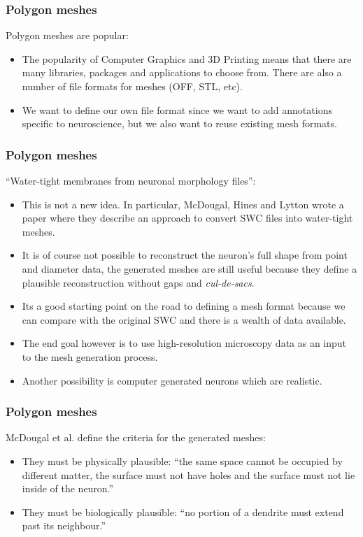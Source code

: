 \documentclass{beamer}
\begin{document}
\begin{frame}
\frametitle{Polygon meshes}

Polygon meshes are popular:

\pause

\begin{itemize}
\item The popularity of Computer Graphics and 3D Printing means that
  there are many libraries, packages and applications to choose
  from. There are also a number of file formats for meshes (OFF, STL,
  etc).
\pause
\item We want to define our own file format since we want to add
  annotations specific to neuroscience, but we also want to reuse
  existing mesh formats.
\end{itemize}

\end{frame}

\begin{frame}
\frametitle{Polygon meshes}

``Water-tight membranes from neuronal morphology files'':

\begin{itemize}
\item This is not a new idea. In particular, McDougal, Hines and
  Lytton wrote a paper\cite{mcdougal2013water} where they describe an
  approach to convert SWC files into water-tight meshes.
\pause
\item It is of course not possible to reconstruct the neuron's full
  shape from point and diameter data, the generated meshes are still
  useful because they define a plausible reconstruction without gaps
  and \emph{cul-de-sacs}.
\pause
\item Its a good starting point on the road to defining a mesh format
  because we can compare with the original SWC and there is a wealth
  of data available.
\pause
\item The end goal however is to use high-resolution microscopy data
  as an input to the mesh generation process.
\pause
\item Another possibility is computer generated neurons which are
  realistic.
\end{itemize}

\end{frame}

\begin{frame}
\frametitle{Polygon meshes}

McDougal et al. define the criteria for the generated meshes:

\begin{itemize}
\item They must be physically plausible: ``the same space cannot be
  occupied by different matter, the surface must not have holes and
  the surface must not lie inside of the
  neuron.''\cite{mcdougal2013water}
\pause
\item They must be biologically plausible: ``no portion of a dendrite
  must extend past its neighbour.''\cite{mcdougal2013water}
\end{itemize}

\end{frame}
\end{document}
